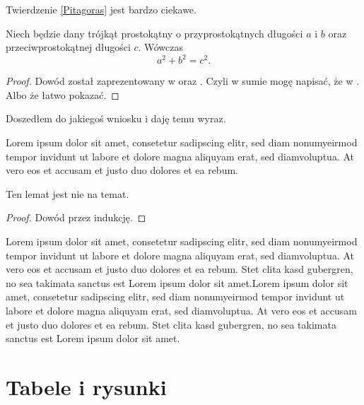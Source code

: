 Twierdzenie \ref{Pitagoras} jest bardzo ciekawe.

\begin{theorem}\label{Pitagoras}
Niech będzie dany trójkąt prostokątny o przyprostokątnych długości $a$ i $b$ oraz przeciwprostokątnej długości $c$. Wówczas
$$
a^2 + b^2 = c^2.
$$
\end{theorem}

\begin{proof}
Dowód został zaprezentowany w \cite{Ktos} oraz \cite{Innyktos}. Czyli w sumie mogę napisać, że w \cite{Ktos, Innyktos}. Albo że łatwo pokazać.
\end{proof}

\begin{corollary}
Doszedłem do jakiegoś wniosku i daję temu wyraz.
\end{corollary}




\begin{remark}
Lorem ipsum dolor sit amet, consetetur sadipscing elitr, sed diam nonumyeirmod tempor invidunt ut labore et dolore magna aliquyam erat, sed diamvoluptua. At vero eos et accusam et justo duo dolores et ea rebum.
\end{remark}

\begin{lemma}[Lemacik]
Ten lemat jest nie na temat.
\end{lemma}
\begin{proof} Dowód przez indukcję.
\end{proof}


Lorem ipsum dolor sit amet, consetetur sadipscing elitr, sed diam nonumyeirmod tempor invidunt ut labore et dolore magna aliquyam erat, sed diamvoluptua. At vero eos et accusam et justo duo dolores et ea rebum. Stet clita kasd gubergren, no sea takimata sanctus est Lorem ipsum dolor sit amet.Lorem ipsum dolor sit amet, consetetur sadipscing elitr, sed diam nonumyeirmod tempor invidunt ut labore et dolore magna aliquyam erat, sed diamvoluptua. At vero eos et accusam et justo duo dolores et ea rebum. Stet clita kasd gubergren, no sea takimata sanctus est Lorem ipsum dolor sit amet.



\section{Tabele i rysunki}

